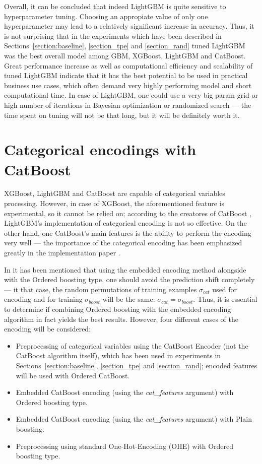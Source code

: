 \documentclass[magisterska, english]{pwr_wmat_praca_dyplomowa}
\theoremstyle{plain}
\numberwithin{theorem}{chapter}
\theoremstyle{definition}
\numberwithin{theorem}{chapter}
\begin{document}
Overall, it can be concluded that indeed LightGBM is quite sensitive to hyperparameter tuning. Choosing an appropiate value of only one hyperparameter may lead to a relatively significant increase in accuracy. Thus, it is not surprising that in the experiments which have been described in Sections~\ref{section:baseline}, \ref{section_tpe} and \ref{section_rand} tuned LightGBM was the best overall model among GBM, XGBoost, LightGBM and CatBoost. Great performance increase as well as computational efficiency and scalability of tuned LightGBM indicate that it has the best potential to be used in practical business use cases, which often demand very highly performing model and short computational time. In case of LightGBM, one could use a very big param grid or high number of iterations in Bayesian optimization or randomized search --- the time spent on tuning will not be that long, but it will be definitely worth it.

\section{Categorical encodings with CatBoost}\label{section:cat_comparison}
XGBoost, LightGBM and CatBoost are capable of categorical variables processing. However, in case of XGBoost, the aforementioned feature is experimental, so it cannot be relied on; according to the creatores of CatBoost \cite{catboost}, LightGBM's implementation of categorical encoding is not so effective. On the other hand, one CatBoost's main features is the ability to perform the encoding very well --- the importance of the categorical encoding has been emphasized greatly in the implementation paper \cite{catboost}.

In \cite{catboost} it has been mentioned that using the embedded encoding method alongside with the Ordered boosting type, one should avoid the prediction shift completely --- it that case, the random permutations of training examples $\sigma_{cat}$ used for encoding and for training $\sigma_{boost}$ will be the same: $\sigma_{cat} = \sigma_{boost}$. Thus, it is essential to determine if combining Ordered boosting with the embedded encoding algorithm in fact yields the best results. However, four different cases of the encoding will be considered:

\begin{itemize}
    \item Preprocessing of categorical variables using the CatBoost Encoder (not the CatBoost algorithm itself), which has been used in experiments in Sections~\ref{section:baseline}, \ref{section_tpe} and \ref{section_rand}; encoded features will be used with Ordered CatBoost.
    \item Embedded CatBoost encoding (using the \emph{cat\_features} argument) with Ordered boosting type.
    \item Embedded CatBoost encoding (using the \emph{cat\_features} argument) with Plain boosting.
    \item Preprocessing using standard One-Hot-Encoding (OHE) with Ordered boosting type.
\end{itemize}
\end{document}
